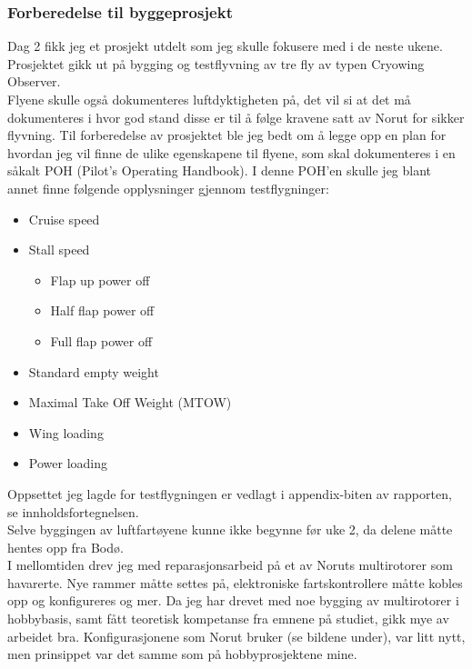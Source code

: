 \documentclass[12pt, a4paper]{report}
\begin{document}
\subsubsection{Forberedelse til byggeprosjekt}
Dag 2 fikk jeg et prosjekt utdelt som jeg skulle fokusere med i de neste ukene. Prosjektet gikk ut på bygging og testflyvning av tre fly av typen Cryowing Observer. \\
Flyene skulle også dokumenteres luftdyktigheten på, det vil si at det må dokumenteres i hvor god stand disse er til å følge kravene satt av Norut for sikker flyvning. Til forberedelse av prosjektet ble jeg bedt om å legge opp en plan for hvordan jeg vil finne de ulike egenskapene til flyene, som skal dokumenteres i en såkalt POH (Pilot's Operating Handbook). I denne POH'en skulle jeg blant annet finne følgende opplysninger gjennom testflygninger: 
\begin{itemize}
	\item Cruise speed
	\item Stall speed
	\begin{itemize}
		\item Flap up power off
		\item Half flap power off
		\item Full flap power off	
	\end{itemize}
	\item Standard empty weight
	\item Maximal Take Off Weight (MTOW)
	\item Wing loading
	\item Power loading
\end{itemize}
Oppsettet jeg lagde for testflygningen er vedlagt i appendix-biten av rapporten, se innholdsfortegnelsen. \\
Selve byggingen av luftfartøyene kunne ikke begynne før uke 2, da delene måtte hentes opp fra Bodø. \\ 
\newpage
I mellomtiden drev jeg med reparasjonsarbeid på et av Noruts multirotorer som havarerte. Nye rammer måtte settes på, elektroniske fartskontrollere måtte kobles opp og konfigureres og mer. Da jeg har drevet med noe bygging av multirotorer i hobbybasis, samt fått teoretisk kompetanse fra emnene på studiet, gikk mye av arbeidet bra. Konfigurasjonene som Norut bruker (se bildene under), var litt nytt, men prinsippet var det samme som på hobbyprosjektene mine. \\
\end{document}
